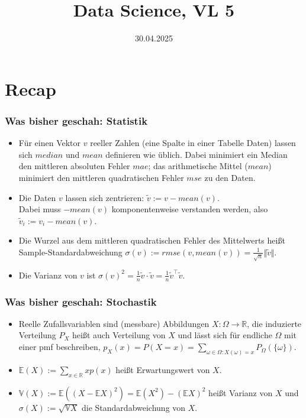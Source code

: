 

\title{Data Science, VL 5} %
\date{30.04.2025}



\begin{frame}
  \titlepage
\end{frame}


\section{Recap}

\begin{frame}
  \frametitle{Was bisher geschah: Statistik}
  \begin{itemize}[<+->]
  \item Für einen Vektor $v$ reeller Zahlen (eine Spalte in einer Tabelle Daten) lassen sich $median$ und $mean$ definieren wie üblich. Dabei minimiert ein Median den mittleren absoluten Fehler $mae$; das arithmetische Mittel ($mean$) minimiert den mittleren quadratischen Fehler $mse$ zu den Daten.
  \item Die Daten $v$ lassen sich \alert{zentrieren}: $\tilde{v} := v - mean(v)$. \\
    Dabei muss $- mean(v)$ komponentenweise verstanden werden, also $\tilde{v}_i := v_i - mean(v)$.
  \item Die Wurzel aus dem mittleren quadratischen Fehler des Mittelwerts heißt \alert{Sample-Standardabweichung} $\sigma(v) := rmse(v,mean(v)) = \frac{1}{\sqrt{n}} \Vert \tilde{v} \Vert$.
    \item Die \alert{Varianz} von $v$ ist $\sigma(v)^2 = \frac{1}{n} \tilde{v} \cdot \tilde{v} = \frac{1}{n} \tilde{v}^\top \tilde{v}$.
  \end{itemize}
\end{frame}

\begin{frame}
  \frametitle{Was bisher geschah: Stochastik}
  \begin{itemize}[<+->]
    \item Reelle \alert{Zufallsvariablen} sind (messbare) Abbildungen $X \colon \Omega \to \mathbb{R}$, die induzierte Verteilung $P_X$ heißt auch \alert{Verteilung von $X$} und lässt sich für endliche $\Omega$ mit einer \alert{pmf} beschreiben, $p_X(x) = P(X = x) = \sum_{\omega \in \Omega : X(\omega)=x} P_\Omega(\{\omega\})$.
    \item $\mathbb{E}(X) := \sum_{x \in \mathbb{R}} x p(x)$ heißt \alert{Erwartungswert} von $X$.
    \item $\mathbb{V}(X) := \mathbb{E}\left({\left(X-\mathbb{E}X\right)}^2\right) = \mathbb{E}(X^2) - {\left(\mathbb{E}X\right)}^2$ heißt \alert{Varianz} von $X$
  und\\
  $\sigma(X) := \sqrt{\mathbb{V}X}$ die \alert{Standardabweichung} von $X$.
  \end{itemize}
\end{frame}

